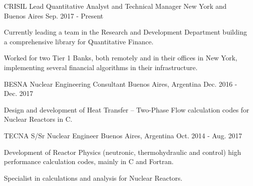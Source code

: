 
\begin{cventries}

  \cventry
    {CRISIL}
    {Lead Quantitative Analyst and Technical Manager}
    {New York and Buenos Aires}
    {Sep. 2017 - Present}
    {
      \begin{cvitems}
        \item{Currently leading a team in the Research and Development Department building a comprehensive library for Quantitative Finance.}
        \item{Worked for two Tier 1 Banks, both remotely and in their offices in New York, implementing several financial algorithms in their infrastructure.}
      \end{cvitems}
      \vspace{1em}
    }

  \cventry
    {BESNA}
    {Nuclear Engineering Consultant}
    {Buenos Aires, Argentina}
    {Dec. 2016 - Dec. 2017}
    {
      \begin{cvitems}
        \item{Design and development of Heat Transfer – Two-Phase Flow calculation codes for Nuclear Reactors in C.}
      \end{cvitems}
      \vspace{1em}
    }

  \cventry
    {TECNA}
    {S/Sr Nuclear Engineer}
    {Buenos Aires, Argentina}
    {Oct. 2014 - Aug. 2017}
    {
      \begin{cvitems}
        \item{Development of Reactor Physics (neutronic, thermohydraulic and control) high performance calculation codes, mainly in C and Fortran.}
        \item{Specialist in calculations and analysis for Nuclear Reactors.}
      \end{cvitems}
    }

\end{cventries}
